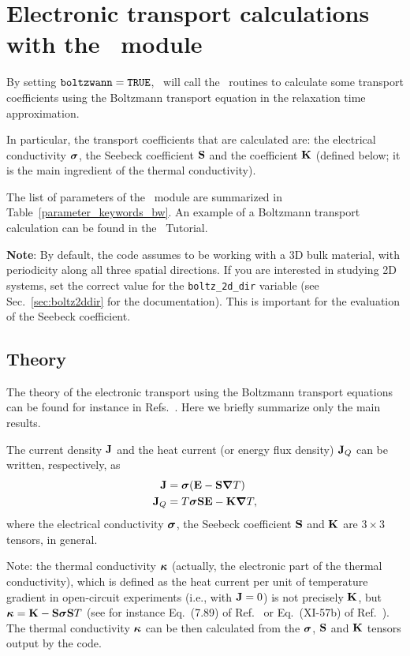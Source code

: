 \chapter{Electronic transport calculations with the \bw\ module}\label{ch:boltzwann}

By setting $\verb#boltzwann#=\verb#TRUE#$, \postw\ will call the \bw\ routines to calculate some transport coefficients using the Boltzmann transport equation in the relaxation time approximation.

In particular, the transport coefficients that are calculated are: the electrical conductivity $\bm{\mathrm{\sigma}}$, the Seebeck coefficient $\bm{\mathrm{S}}$ and the coefficient $\bm{\mathrm{K}}$ (defined below; it is the main ingredient of the thermal conductivity). 

The list of parameters of the \bw\ module are summarized in Table~\ref{parameter_keywords_bw}. 
An example of a Boltzmann transport calculation can be found in the \wannier\ Tutorial. 

\textbf{Note}: By default, the code assumes to be working with a 3D bulk material, with periodicity along all three spatial directions. If you are interested in studying 2D systems, set the correct value for the \texttt{boltz\_2d\_dir} variable (see Sec.~\ref{sec:boltz2ddir} for the documentation). This is important for the evaluation of the Seebeck coefficient.

\section{Theory}
\label{sec:boltzwann-theory}
The theory of the electronic transport using the Boltzmann transport equations can be found for instance in Refs.~\cite{ziman-book72,grosso-book00,mahan-itc06}. Here we briefly summarize only the main results. 

The current density $\bm{\mathrm{J}}$ and the heat current (or energy flux density) $\bm{\mathrm{J}}_Q$ can be written, respectively, as
\begin{align}
  \bm{\mathrm{J}}   &= \bm{\mathrm{\sigma}}(\bm{\mathrm{E}} - \bm{\mathrm{S}} \bm{\mathrm{\nabla}} T) \\
  \bm{\mathrm{J}}_Q &= T \bm{\mathrm{\sigma}} \bm{\mathrm{S}} \bm{\mathrm{E}} - \bm{\mathrm{K}} \bm{\mathrm{\nabla}} T,
\end{align}
where the electrical conductivity $\bm{\mathrm{\sigma}}$, the Seebeck coefficient $\bm{\mathrm{S}}$ and $\bm{\mathrm{K}}$ are $3\times 3$ tensors, in general.

Note: the thermal conductivity $\bm{\mathrm{\kappa}}$ (actually, the electronic part of the thermal conductivity), which is defined as the heat current per unit of temperature gradient in open-circuit experiments (i.e., with $\bm{\mathrm{J}}=0$) is not precisely $\bm{\mathrm{K}}$, but  $\bm{\mathrm{\kappa}} = \bm{\mathrm{K}}-\bm{\mathrm{S}} \bm{\mathrm{\sigma}} \bm{\mathrm{S}} T$ (see for instance Eq.~(7.89) of Ref.~\cite{ziman-book72} or Eq.~(XI-57b) of Ref.~\cite{grosso-book00}).
The thermal conductivity $\bm{\mathrm{\kappa}}$ can be then calculated from the $\bm{\mathrm{\sigma}}$, $\bm{\mathrm{S}}$ and $\bm{\mathrm{K}}$ tensors output by the code.

